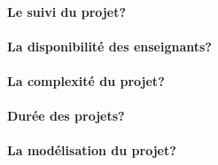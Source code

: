 \documentclass[10pt,a4wide]{article}
\begin{document}
\paragraph{}

\textbf{Le suivi du projet?}
\paragraph{}
\paragraph{}
\paragraph{}

\textbf{La disponibilit\'e des enseignants?}
\paragraph{}
\paragraph{}
\paragraph{}

\textbf{La complexit\'e du projet?}
\paragraph{}
\paragraph{}
\paragraph{}

\textbf{Dur\'ee des projets?}
\paragraph{}
\paragraph{}
\paragraph{}

\textbf{La mod\'elisation du projet?}
\end{document}
